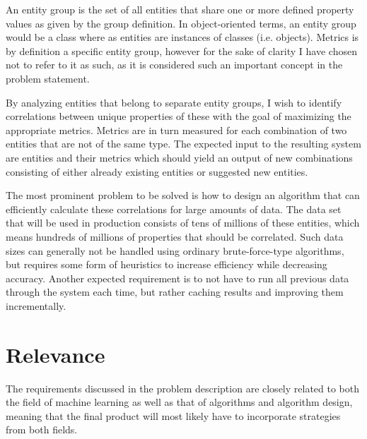 \documentclass[a4paper]{article}
\begin{document}
An entity group is the set of all entities that share one or more defined property values as given by the group definition. In object-oriented terms, an entity group would be a class where as entities are instances of classes (i.e. objects). Metrics is by definition a specific entity group, however for the sake of clarity I have chosen not to refer to it as such, as it is considered such an important concept in the problem statement.

By analyzing entities that belong to separate entity groups, I wish to identify correlations between unique properties of these with the goal of maximizing the appropriate metrics. Metrics are in turn measured for each combination of two entities that are not of the same type. The expected input to the resulting system are entities and their metrics which should yield an output of new combinations consisting of either already existing entities or suggested new entities.

The most prominent problem to be solved is how to design an algorithm that can efficiently calculate these correlations for large amounts of data. The data set that will be used in production consists of tens of millions of these entities, which means hundreds of millions of properties that should be correlated. Such data sizes can generally not be handled using ordinary brute-force-type algorithms, but requires some form of heuristics to increase efficiency while decreasing accuracy. Another expected requirement is to not have to run all previous data through the system each time, but rather caching results and improving them incrementally.

\section{Relevance}
The requirements discussed in the problem description are closely related to both the field of machine learning as well as that of algorithms and algorithm design, meaning that the final product will most likely have to incorporate strategies from both fields.
\end{document}
